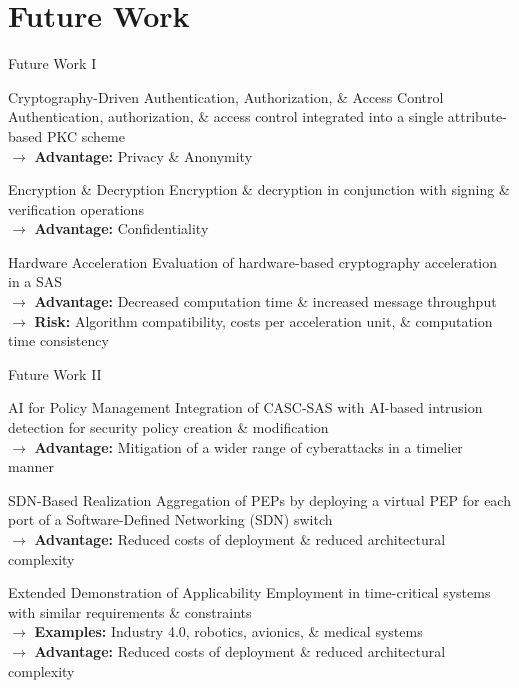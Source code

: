 \documentclass[en]{sdqbeamer}
\begin{document}
\section{Future Work}
\begin{frame}{Future Work I}
    \begin{blueblock}{Cryptography-Driven Authentication, Authorization, \& Access Control}
        Authentication, authorization, \& access control integrated into a single attribute-based PKC scheme
        \\$\rightarrow$ \textbf{Advantage:} Privacy \& Anonymity
    \end{blueblock}
    \begin{blueblock}{Encryption \& Decryption}
        Encryption \& decryption in conjunction with signing \& verification operations
        \\$\rightarrow$ \textbf{Advantage:} Confidentiality
    \end{blueblock}
    \begin{blueblock}{Hardware Acceleration}
        Evaluation of hardware-based cryptography acceleration in a SAS
        \\$\rightarrow$ \textbf{Advantage:} Decreased computation time \& increased message throughput
        \\$\rightarrow$ \textbf{Risk:} Algorithm compatibility, costs per acceleration unit, \& computation time consistency
    \end{blueblock}
\end{frame}
\begin{frame}{Future Work II}
    \begin{blueblock}{AI for Policy Management}
        Integration of CASC-SAS with AI-based intrusion detection for security policy creation \& modification
        \\$\rightarrow$ \textbf{Advantage:} Mitigation of a wider range of cyberattacks in a timelier manner
    \end{blueblock}
    \begin{blueblock}{SDN-Based Realization}
        Aggregation of PEPs by deploying a virtual PEP for each port of a Software-Defined Networking (SDN) switch
        \\$\rightarrow$ \textbf{Advantage:} Reduced costs of deployment \& reduced architectural complexity
    \end{blueblock}
    \begin{blueblock}{Extended Demonstration of Applicability}
        Employment in time-critical systems with similar requirements \& constraints
        \\$\rightarrow$ \textbf{Examples:} Industry 4.0, robotics, avionics, \& medical systems
        \\$\rightarrow$ \textbf{Advantage:} Reduced costs of deployment \& reduced architectural complexity
    \end{blueblock}
\end{frame}
\end{document}
